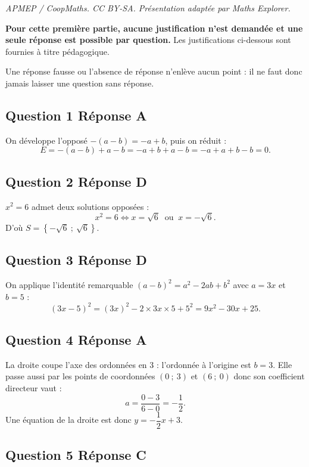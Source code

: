 \documentclass[10pt]{article}
\begin{document}
\noindent\textit{APMEP / CoopMaths. CC BY-SA. Présentation adaptée par Maths Explorer.}\par\medskip
\textbf{Pour cette première partie, aucune justification n'est demandée et une seule réponse est possible par question.} Les justifications ci-dessous sont fournies à titre pédagogique.

Une réponse fausse ou l'absence de réponse n'enlève aucun point : il ne faut donc jamais laisser une question sans réponse.

\subsection*{Question 1 \quad Réponse A}

On développe l'opposé $-(a-b) = -a + b$, puis on réduit :
\[E = -(a-b) + a - b = -a + b + a - b = -a+a + b-b = 0.\]

\subsection*{Question 2 \quad Réponse D}

$x^2 = 6$ admet deux solutions opposées :
\[x^2 = 6 \iff x = \sqrt{6} \ \text{ ou } \ x = -\sqrt{6}.\]
D'où $S = \left\{-\sqrt{6}~;~\sqrt{6}\right\}$.

\subsection*{Question 3 \quad Réponse D}

On applique l'identité remarquable $(a-b)^2 = a^2 - 2ab + b^2$ avec $a = 3x$ et $b = 5$ :
\[(3x-5)^2 = (3x)^2 - 2\times 3x \times 5 + 5^2 = 9x^2 - 30x + 25.\]

\subsection*{Question 4 \quad Réponse A}

La droite coupe l'axe des ordonnées en 3 : l'ordonnée à l'origine est $b = 3$. Elle passe
aussi par les points de coordonnées $(0~;~3)$ et $(6~;~0)$ donc son coefficient directeur vaut :
\[a = \dfrac{0 - 3}{6 - 0} = -\dfrac{1}{2}.\]
Une équation de la droite est donc $y = -\dfrac{1}{2}x + 3$.

\subsection*{Question 5 \quad Réponse C}
\end{document}
